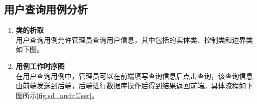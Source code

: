 
	\subsection{用户查询用例分析} %
	\label{sub:用户查询用例分析}
	\begin{enumerate}
		\item \textbf{类的析取} \\
		用户查询用例允许管理员查询用户信息，其中包括的实体类、控制类和边界类如下图。

		\item \textbf{用例工作时序图} \\
		在用户查询用例中，管理员可以在前端填写查询信息后点击查询，该查询信息由前端发送到后端，后端进行数据库操作后得到结果返回前端。具体流程如下图所示\autoref{fig:sd_auditUser}。


	\end{enumerate}

